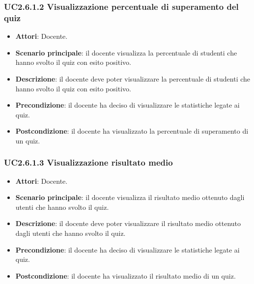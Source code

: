 \subsubsection{UC2.6.1.2 Visualizzazione percentuale di superamento del quiz}
\begin{itemize}
\item \textbf{Attori}: Docente.
\item \textbf{Scenario principale}: il docente visualizza la percentuale di studenti che hanno svolto il quiz con esito positivo.
\item \textbf{Descrizione}: il docente deve poter visualizzare la percentuale di studenti che hanno svolto il quiz con esito positivo.
\item \textbf{Precondizione}: il docente ha deciso di visualizzare le statistiche legate ai quiz.
\item \textbf{Postcondizione}: il docente ha visualizzato la percentuale di superamento di un quiz.
\end{itemize}
\subsubsection{UC2.6.1.3 Visualizzazione risultato medio}
\begin{itemize}
\item \textbf{Attori}: Docente.
\item \textbf{Scenario principale}: il docente visualizza il risultato medio ottenuto dagli utenti che hanno svolto il quiz.
\item \textbf{Descrizione}: il docente deve poter visualizzare il risultato medio ottenuto dagli utenti che hanno svolto il quiz.
\item \textbf{Precondizione}: il docente ha deciso di visualizzare le statistiche legate ai quiz.
\item \textbf{Postcondizione}: il docente ha visualizzato il risultato medio di un quiz.
\end{itemize}
